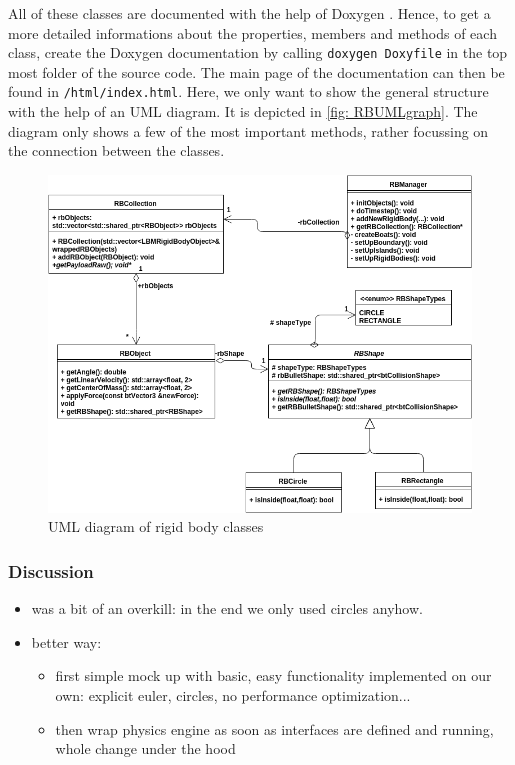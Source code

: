 All of these classes are documented with the help of Doxygen \cite{Doxygen}. Hence, to get a more detailed informations about the properties, members and methods of each class, create the Doxygen documentation by calling \texttt{doxygen Doxyfile} in the top most folder of the source code. The main page of the documentation can then be found in \texttt{/html/index.html}. Here, we only want to show the general structure with the help of an UML diagram. It is depicted in \autoref{fig: RBUMLgraph}. The diagram only shows a few of the most important methods, rather focussing on the connection between the classes.
\begin{figure}[ht]
\centering
\includegraphics[scale=0.5]{img/RigidBodies/RigidBodyUML.png}
\caption{UML diagram of rigid body classes}
\label{fig: RBUMLgraph}
\end{figure}

\subsubsection{Discussion}
\begin{itemize}
\item was a bit of an overkill: in the end we only used circles anyhow.
\item better way: 
\begin{itemize}
\item first simple mock up with basic, easy functionality implemented on our own: explicit euler, circles, no performance optimization...
\item then wrap physics engine as soon as interfaces are defined and running, whole change under the hood
\end{itemize}
\end{itemize}


